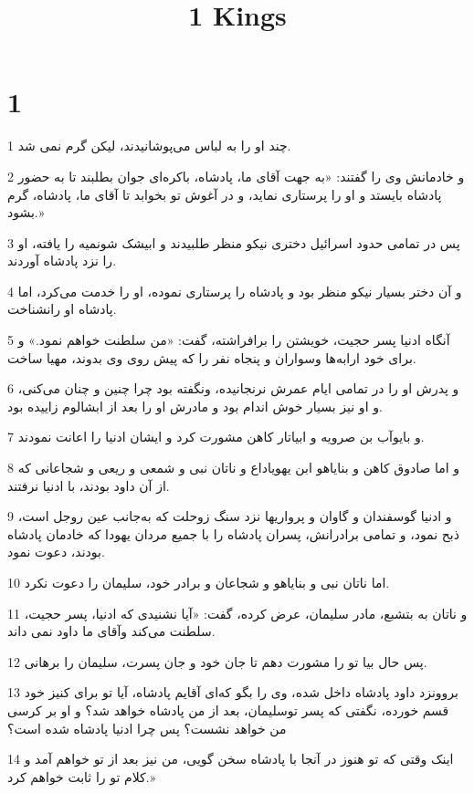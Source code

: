 

\title{1 Kings}

 
\chapter{1}

\par 1 چند او را به لباس می‌پوشانیدند، لیکن گرم نمی شد.
\par 2 و خادمانش وی را گفتند: «به جهت آقای ما، پادشاه، باکره‌ای جوان بطلبند تا به حضور پادشاه بایستد و او را پرستاری نماید، و در آغوش تو بخوابد تا آقای ما، پادشاه، گرم بشود.»
\par 3 پس در تمامی حدود اسرائیل دختری نیکو منظر طلبیدند و ابیشک شونمیه را یافته، او را نزد پادشاه آوردند.
\par 4 و آن دختر بسیار نیکو منظر بود و پادشاه را پرستاری نموده، او را خدمت می‌کرد، اما پادشاه او رانشناخت.
\par 5 آنگاه ادنیا پسر حجیت، خویشتن را برافراشته، گفت: «من سلطنت خواهم نمود.» و برای خود ارابه‌ها وسواران و پنجاه نفر را که پیش روی وی بدوند، مهیا ساخت.
\par 6 و پدرش او را در تمامی ایام عمرش نرنجانیده، ونگفته بود چرا چنین و چنان می‌کنی، و او نیز بسیار خوش اندام بود و مادرش او را بعد از ابشالوم زاییده بود.
\par 7 و بایوآب بن صرویه و ابیاتار کاهن مشورت کرد و ایشان ادنیا را اعانت نمودند.
\par 8 و اما صادوق کاهن و بنایاهو ابن یهویاداع و ناتان نبی و شمعی و ریعی و شجاعانی که از آن داود بودند، با ادنیا نرفتند.
\par 9 و ادنیا گوسفندان و گاوان و پرواریها نزد سنگ زوحلت که به‌جانب عین روجل است، ذبح نمود، و تمامی برادرانش، پسران پادشاه را با جمیع مردان یهودا که خادمان پادشاه بودند، دعوت نمود.
\par 10 اما ناتان نبی و بنایاهو و شجاعان و برادر خود، سلیمان را دعوت نکرد.
\par 11 و ناتان به بتشبع، مادر سلیمان، عرض کرده، گفت: «آیا نشنیدی که ادنیا، پسر حجیت، سلطنت می‌کند وآقای ما داود نمی داند.
\par 12 پس حال بیا تو را مشورت دهم تا جان خود و جان پسرت، سلیمان را برهانی.
\par 13 بروونزد داود پادشاه داخل شده، وی را بگو که‌ای آقایم پادشاه، آیا تو برای کنیز خود قسم خورده، نگفتی که پسر توسلیمان، بعد از من پادشاه خواهد شد؟ و او بر کرسی من خواهد نشست؟ پس چرا ادنیا پادشاه شده است؟
\par 14 اینک وقتی که تو هنوز در آنجا با پادشاه سخن گویی، من نیز بعد از تو خواهم آمد و کلام تو را ثابت خواهم کرد.»
